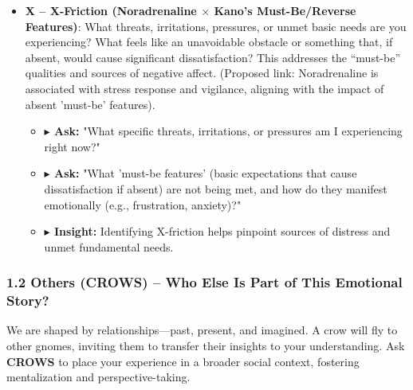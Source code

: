 \documentclass{article}
\begin{document}
\begin{itemize}[noitemsep,topsep=0pt]
\begin{itemize}[noitemsep,topsep=0pt]
    \end{itemize}
    \item \textbf{X – X-Friction (Noradrenaline $\times$ Kano’s Must-Be/Reverse Features)}: What threats, irritations, pressures, or unmet basic needs are you experiencing? What feels like an unavoidable obstacle or something that, if absent, would cause significant dissatisfaction? This addresses the ``must-be'' qualities and sources of negative affect. (Proposed link: Noradrenaline is associated with stress response and vigilance, aligning with the impact of absent 'must-be' features).
    \begin{itemize}[noitemsep,topsep=0pt]
        \item \textbf{$\blacktriangleright$ Ask:} "What specific threats, irritations, or pressures am I experiencing right now?"
        \item \textbf{$\blacktriangleright$ Ask:} "What 'must-be features' (basic expectations that cause dissatisfaction if absent) are not being met, and how do they manifest emotionally (e.g., frustration, anxiety)?"
        \item \textbf{$\blacktriangleright$ Insight:} Identifying X-friction helps pinpoint sources of distress and unmet fundamental needs.
    \end{itemize}
\end{itemize}

\subsubsection{1.2 Others (CROWS) – Who Else Is Part of This Emotional Story?}
We are shaped by relationships—past, present, and imagined. A crow will fly to other gnomes, inviting them to transfer their insights to your understanding. Ask \textbf{CROWS} to place your experience in a broader social context, fostering mentalization and perspective-taking.

\begin{center}
\end{center}
\end{document}

